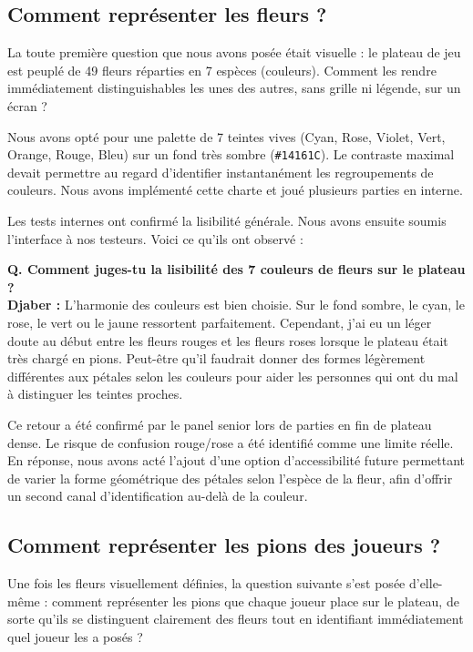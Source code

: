 \documentclass[11pt,a4paper]{article}
\begin{document}
\subsection{Comment représenter les fleurs ?}

La toute première question que nous avons posée était visuelle : le plateau de jeu est peuplé de 49 fleurs réparties en 7 espèces (couleurs). Comment les rendre immédiatement distinguishables les unes des autres, sans grille ni légende, sur un écran ?

Nous avons opté pour une palette de 7 teintes vives (Cyan, Rose, Violet, Vert, Orange, Rouge, Bleu) sur un fond très sombre (\texttt{\#14161C}). Le contraste maximal devait permettre au regard d'identifier instantanément les regroupements de couleurs. Nous avons implémenté cette charte et joué plusieurs parties en interne.

Les tests internes ont confirmé la lisibilité générale. Nous avons ensuite soumis l'interface à nos testeurs. Voici ce qu'ils ont observé :

\begin{tcolorbox}[nongamerbox, title={Djaber -- 23 ans, étudiant en design graphique}]
    \textbf{Q. Comment juges-tu la lisibilité des 7 couleurs de fleurs sur le plateau ?}\\
    \textbf{Djaber :} L'harmonie des couleurs est bien choisie. Sur le fond sombre, le cyan, le rose, le vert ou le jaune ressortent parfaitement. Cependant, j'ai eu un léger doute au début entre les fleurs rouges et les fleurs roses lorsque le plateau était très chargé en pions. Peut-être qu'il faudrait donner des formes légèrement différentes aux pétales selon les couleurs pour aider les personnes qui ont du mal à distinguer les teintes proches.
\end{tcolorbox}

Ce retour a été confirmé par le panel senior lors de parties en fin de plateau dense. Le risque de confusion rouge/rose a été identifié comme une limite réelle. En réponse, nous avons acté l'ajout d'une option d'accessibilité future permettant de varier la forme géométrique des pétales selon l'espèce de la fleur, afin d'offrir un second canal d'identification au-delà de la couleur.

\subsection{Comment représenter les pions des joueurs ?}

Une fois les fleurs visuellement définies, la question suivante s'est posée d'elle-même : comment représenter les pions que chaque joueur place sur le plateau, de sorte qu'ils se distinguent clairement des fleurs tout en identifiant immédiatement quel joueur les a posés ?
\end{document}
